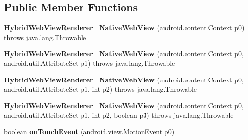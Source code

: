 \subsection*{Public Member Functions}
\begin{DoxyCompactItemize}
\item 
\hypertarget{classmd5aba1581820273abb5f52cfbdde47dc28_1_1HybridWebViewRenderer__NativeWebView_a946f54735c34132a4f3195f70ca38fe2}{}{\bfseries Hybrid\+Web\+View\+Renderer\+\_\+\+Native\+Web\+View} (android.\+content.\+Context p0)  throws java.\+lang.\+Throwable 	\label{classmd5aba1581820273abb5f52cfbdde47dc28_1_1HybridWebViewRenderer__NativeWebView_a946f54735c34132a4f3195f70ca38fe2}

\item 
\hypertarget{classmd5aba1581820273abb5f52cfbdde47dc28_1_1HybridWebViewRenderer__NativeWebView_a326ab382e7d87cb22a923e807e7573ed}{}{\bfseries Hybrid\+Web\+View\+Renderer\+\_\+\+Native\+Web\+View} (android.\+content.\+Context p0, android.\+util.\+Attribute\+Set p1)  throws java.\+lang.\+Throwable 	\label{classmd5aba1581820273abb5f52cfbdde47dc28_1_1HybridWebViewRenderer__NativeWebView_a326ab382e7d87cb22a923e807e7573ed}

\item 
\hypertarget{classmd5aba1581820273abb5f52cfbdde47dc28_1_1HybridWebViewRenderer__NativeWebView_a57bbe35c0d52f44e984b3eaf19e687c1}{}{\bfseries Hybrid\+Web\+View\+Renderer\+\_\+\+Native\+Web\+View} (android.\+content.\+Context p0, android.\+util.\+Attribute\+Set p1, int p2)  throws java.\+lang.\+Throwable 	\label{classmd5aba1581820273abb5f52cfbdde47dc28_1_1HybridWebViewRenderer__NativeWebView_a57bbe35c0d52f44e984b3eaf19e687c1}

\item 
\hypertarget{classmd5aba1581820273abb5f52cfbdde47dc28_1_1HybridWebViewRenderer__NativeWebView_a6159e4ee7f60964e0bd027f6925275ad}{}{\bfseries Hybrid\+Web\+View\+Renderer\+\_\+\+Native\+Web\+View} (android.\+content.\+Context p0, android.\+util.\+Attribute\+Set p1, int p2, boolean p3)  throws java.\+lang.\+Throwable 	\label{classmd5aba1581820273abb5f52cfbdde47dc28_1_1HybridWebViewRenderer__NativeWebView_a6159e4ee7f60964e0bd027f6925275ad}

\item 
\hypertarget{classmd5aba1581820273abb5f52cfbdde47dc28_1_1HybridWebViewRenderer__NativeWebView_ac9c7e589c07942014736e93d694042f7}{}boolean {\bfseries on\+Touch\+Event} (android.\+view.\+Motion\+Event p0)\label{classmd5aba1581820273abb5f52cfbdde47dc28_1_1HybridWebViewRenderer__NativeWebView_ac9c7e589c07942014736e93d694042f7}


\end{DoxyCompactItemize}
